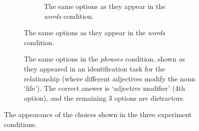\begin{figure}[th]
\begin{subfigure}{0.5\columnwidth}
	    \begin{subfigure}{\columnwidth}
	    	\centering
	        \caption {The same options as they appear in the \emph{words} condition. \label{fig:words-choices}}
	    \end{subfigure}
\end{subfigure}
\quad
\begin{subfigure} {1.5\columnwidth}
			\centering
	\caption{\label{fig:task} The same options in the \emph{phrases} condition, shown as they appeared in an identification task for the relationship  (where different adjectives modify the noun `life'). The correct answer is `adjective modifier' (4th option), and the remaining 3 options are distractors.}
	\end{subfigure}

\caption{\label{fig:choices} The appearance of the choices shown in the three experiment conditions.}
\end{figure}

